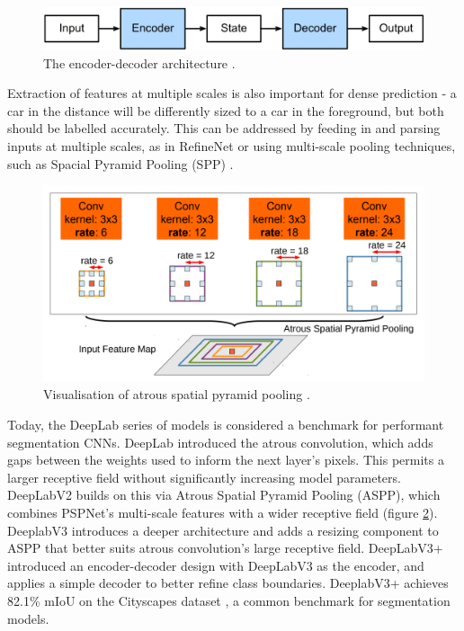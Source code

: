 \documentclass[a4paper,12pt]{report}
\begin{document}
\begin{figure}[t]
    \centering
    \includegraphics[width=\textwidth]{res/encoder-decoder.png}
    \caption{The encoder-decoder architecture \cite{zhang_dive_2019}.}
    \label{fig:encoder_decoder}
\end{figure}

Extraction of features at multiple scales is also important for dense prediction - a car in the distance will be differently sized to a car in the foreground, but both should be labelled accurately. This can be addressed by feeding in and parsing inputs at multiple scales, as in RefineNet \cite{lin_refinenet_2016} or using multi-scale pooling techniques, such as Spacial Pyramid Pooling (SPP) \cite{he_spatial_2014}.

\begin{figure}[h]
    \centering
    \includegraphics[scale=0.5]{res/deeplab-aspp.png}
    \caption{Visualisation of atrous spatial pyramid pooling \cite{chen_deeplab_2017}.}
    \label{fig:deeplab_aspp}
\end{figure}

Today, the DeepLab series of models is considered a benchmark for performant segmentation CNNs. DeepLab \cite{chen_semantic_2016} introduced the atrous convolution, which adds gaps between the weights used to inform the next layer’s pixels. This permits a larger receptive field without significantly increasing model parameters. DeepLabV2 \cite{chen_deeplab_2017} builds on this via Atrous Spatial Pyramid Pooling (ASPP), which combines PSPNet’s \cite{zhao_pyramid_2017} multi-scale features with a wider receptive field (figure \ref{fig:deeplab_aspp}). DeeplabV3 \cite{chen_rethinking_2017} introduces a deeper architecture and adds a resizing component to ASPP that better suits atrous convolution’s large receptive field. DeepLabV3+ \cite{chen_encoder-decoder_2018} introduced an encoder-decoder design with DeepLabV3 as the encoder, and applies a simple decoder to better refine class boundaries. DeeplabV3+ achieves 82.1\% mIoU on the Cityscapes dataset \cite{cordts_cityscapes_2016}, a common benchmark for segmentation models.
\end{document}
